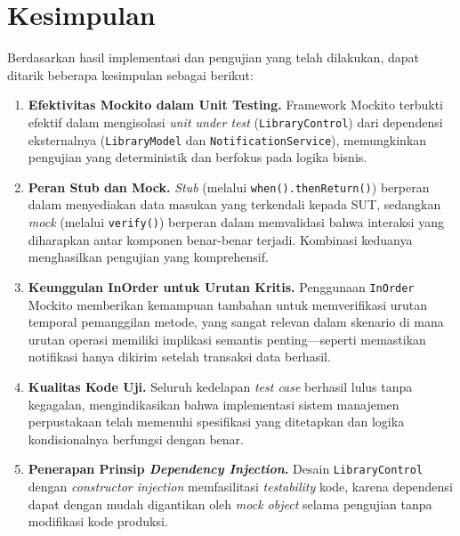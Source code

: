 \documentclass[12pt,a4paper]{article}
\begin{document}
\section{Kesimpulan}

Berdasarkan hasil implementasi dan pengujian yang telah dilakukan, dapat
ditarik beberapa kesimpulan sebagai berikut:

\begin{enumerate}[label=\arabic*.]
    \item \textbf{Efektivitas Mockito dalam Unit Testing.} Framework Mockito
          terbukti efektif dalam mengisolasi \textit{unit under test}
          (\texttt{LibraryControl}) dari dependensi eksternalnya
          (\texttt{LibraryModel} dan \texttt{NotificationService}),
          memungkinkan pengujian yang deterministik dan berfokus pada logika
          bisnis.

    \item \textbf{Peran Stub dan Mock.} \textit{Stub} (melalui
          \texttt{when().thenReturn()}) berperan dalam menyediakan data
          masukan yang terkendali kepada SUT, sedangkan \textit{mock}
          (melalui \texttt{verify()}) berperan dalam memvalidasi bahwa
          interaksi yang diharapkan antar komponen benar-benar terjadi.
          Kombinasi keduanya menghasilkan pengujian yang komprehensif.

    \item \textbf{Keunggulan InOrder untuk Urutan Kritis.} Penggunaan
          \texttt{InOrder} Mockito memberikan kemampuan tambahan untuk
          memverifikasi urutan temporal pemanggilan metode, yang sangat
          relevan dalam skenario di mana urutan operasi memiliki implikasi
          semantis penting—seperti memastikan notifikasi hanya dikirim
          setelah transaksi data berhasil.

    \item \textbf{Kualitas Kode Uji.} Seluruh kedelapan \textit{test case}
          berhasil lulus tanpa kegagalan, mengindikasikan bahwa implementasi
          sistem manajemen perpustakaan telah memenuhi spesifikasi yang
          ditetapkan dan logika kondisionalnya berfungsi dengan benar.

    \item \textbf{Penerapan Prinsip \textit{Dependency Injection}.}
          Desain \texttt{LibraryControl} dengan \textit{constructor injection}
          memfasilitasi \textit{testability} kode, karena dependensi dapat
          dengan mudah digantikan oleh \textit{mock object} selama pengujian
          tanpa modifikasi kode produksi.
\end{enumerate}
\end{document}
